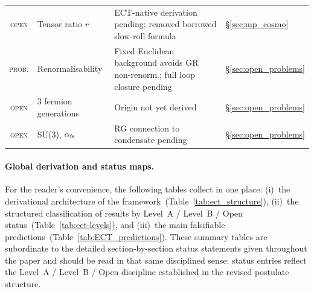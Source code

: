 \documentclass[11pt,a4paper]{article}
\numberwithin{equation}{section}
\begin{document}
\begin{table}[H]
\begin{tabular}{cp{3.8cm}p{7.2cm}l}
\textsc{open} & Tensor ratio $r$ & ECT-native derivation pending; removed borrowed slow-roll formula & \S\ref{sec:mp_cosmo} \\
\textsc{prob.}& Renormalisability         & Fixed Euclidean background avoids GR non-renorm.; full loop closure pending & \S\ref{sec:open_problems} \\
\textsc{open} & 3 fermion generations     & Origin not yet derived                                & \S\ref{sec:open_problems} \\
\textsc{open} & SU(3), $\alpha_{\rm fs}$  & RG connection to condensate pending                   & \S\ref{sec:open_problems} \\
\bottomrule
\end{tabular}
\end{table}


\paragraph{Global derivation and status maps.}
For the reader's convenience, the following tables collect in one place:
(i)~the derivational architecture of the framework~(Table~\ref{tab:ect_structure}),
(ii)~the structured classification of results by Level~A / Level~B / Open status~(Table~\ref{tab:ect-levels}),
and (iii)~the main falsifiable predictions~(Table~\ref{tab:ECT_predictions}).
These summary tables are subordinate to the detailed section-by-section status
statements given throughout the paper and should be read in that same disciplined
sense: status entries reflect the Level~A / Level~B / Open discipline established
in the revised postulate structure.
\end{document}
